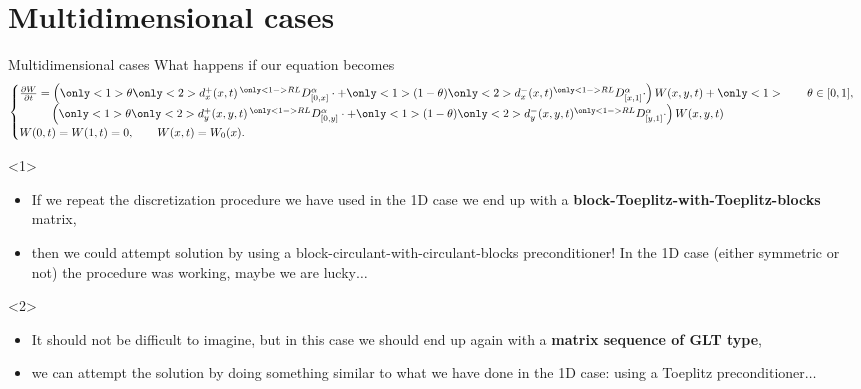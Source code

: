 \documentclass[aspectratio=169,xcolor=dvipsnames]{beamer}
\begin{document}
	\section{Multidimensional cases}
	\only
	\begin{frame}{Multidimensional cases}
	What happens if our equation becomes
	\begin{equation*}
	\begin{cases}\frac{\partial W}{\partial t} = \left( \only<1>{\theta}\only<2>{d^+_x(x,t)}  \,{}^{\only<1->{RL}}D_{[0,x]}^\alpha  \cdot + \only<1>(1-\theta)\only<2>{d^-_x(x,t)} {}^{\only<1->{RL}}D_{[x,1]}^\alpha \cdot \right) W(x,y,t) + \only<1>{\qquad \theta \in [0,1]},\\
	\phantom{\frac{\partial W}{\partial t} =}\left( \only<1>{\theta}\only<2>{d^+_y(x,y,t)}  \,{}^{\only<1->{RL}}D_{[0,y]}^\alpha  \cdot + \only<1>(1-\theta)\only<2>{d^-_y(x,y,t)} {}^{\only<1->{RL}}D_{[y,1]}^\alpha \cdot \right) W(x,y,t)\\
		W(0,t) = W(1,t) = 0, \qquad W(x,t) = W_0(x).	
	\end{cases}
	\end{equation*}
	\begin{onlyenv}
	\begin{itemize}
		\item[\faWrench] If we repeat the discretization procedure we have used in the 1D case we end up with a \textbf{block-Toeplitz-with-Toeplitz-blocks} matrix,
		\item[\faLightbulb] then we could attempt solution by using a \alert{block-circulant-with-circulant-blocks} preconditioner! In the 1D case (either symmetric or not) the procedure was working, maybe we are lucky$\ldots$
	\end{itemize}
	\end{onlyenv}
	\begin{onlyenv}
	\begin{itemize}
		\item[\faWrench] It should not be difficult to imagine, but in this case we should end up again with a \textbf{matrix sequence of GLT type},
		\item[\faLightbulb] we can attempt the solution by doing something similar to what we have done in the 1D case: using a Toeplitz preconditioner$\ldots$
	\end{itemize}
	\end{onlyenv}

	\end{frame}
\end{document}
